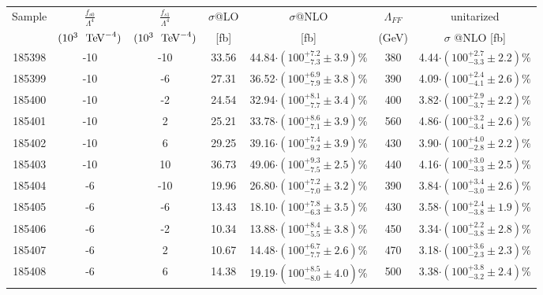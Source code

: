 \begin{table}[ht!]
  \centering
  {
\renewcommand{\arraystretch}{1.3}
\begin{tabular}{c|c|c|c|c|c|c}
  \hline
  Sample & $\frac{f_{s0}}{\Lambda^4} $ & $\frac{f_{s1}}{\Lambda^4} $ & $\sigma$@LO  & $\sigma$@NLO & $\Lambda_{FF}$  & unitarized  \\
     & $(10^3~\TeV^{-4})$ & $(10^3~\TeV^{-4})$ & [fb] & [fb] &  (GeV) & $\sigma$ @NLO [fb] \\
\hline \hline
185398 & -10 &	-10 & 33.56 &         44.84$\cdot (100^{+7.2}_{-7.3}\pm3.9  )$\% &           380    &       4.44$\cdot (100^{+2.7}_{-3.3}\pm 2.2)\%$ \\
185399 &  -10 &	-6  &     27.31 &     36.52$\cdot (100^{+6.9}_{-7.9}\pm 3.8 )$\% &      390   &        4.09$\cdot (100^{+2.4}_{-4.1}\pm 2.6 )\%$  \\
185400 &  -10  &  -2  &  24.54  &     32.94$\cdot (100^{+8.1}_{-7.7}\pm3.4  )$\%  &     400      &            3.82$\cdot (100^{+2.9}_{-3.7}\pm 2.2)$\% \\ 
185401 & -10   &  2   &  25.21   &    33.78$\cdot (100^{+8.6}_{-7.1}\pm3.9 )$\%   &    560       &           4.86$\cdot (100^{+3.2}_{-3.4}\pm 2.6)$\%\\ 
185402 & -10   &  6   &  29.25   &    39.16$\cdot (100^{+7.4}_{-9.2}\pm3.9  )$\%   &    430       &           3.90$\cdot (100^{+4.0}_{-2.8}\pm 2.2)$\%\\
185403 & -10   &  10  &  36.73   &    49.06$\cdot (100^{+9.3}_{-7.5}\pm2.5 )$\%   &    440       &           4.16$\cdot (100^{+3.0}_{-3.3}\pm 2.5 )$\% \\
\hline
185404 & -6    &  -10 &  19.96   &    26.80$\cdot (100^{+7.2}_{-7.0}\pm 3.2 )$\%    &   390       &           3.84$\cdot (100^{+3.4}_{-3.0}\pm 2.6)$\% \\ 
185405 & -6    &  -6  &  13.43   &    18.10$\cdot (100^{+7.8}_{-6.3}\pm 3.5 )$\%    &   430       &           3.58$\cdot (100^{+2.4}_{-3.8}\pm 1.9)$\% \\
185406 & -6    &  -2  &  10.34   &    13.88$\cdot (100^{+8.4}_{-5.5}\pm 3.8 )$\%   &    450       &           3.34$\cdot (100^{+2.2}_{-3.8}\pm 2.8)$\% \\
185407 & -6    &  2   &  10.67   &    14.48$\cdot (100^{+6.7}_{-7.7}\pm 2.6 )$\%   &    470       &           3.18$\cdot (100^{+3.6}_{-2.3}\pm 2.3 )$\% \\
185408 & -6    &  6   &  14.38   &    19.19$\cdot (100^{+8.5}_{-8.0}\pm  4.0 )$\%   &    500       &           3.38$\cdot (100^{+3.8}_{-3.2}\pm 2.4)$\%\\

\end{tabular}}
\end{table}
